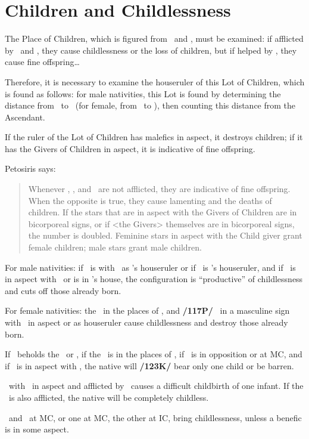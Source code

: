 \section{Children and Childlessness}
The Place of Children, which is figured from \Mercury\, and \Venus, must be examined: if afflicted by \Saturn\, and \Mars, they cause childlessness or the loss of children, but if helped by \Jupiter, they cause fine offspring\ldots

Therefore, it is necessary to examine the houseruler of this Lot of Children, which is found as follows: for male nativities, this Lot is found by determining the distance from \Jupiter\, to \Mercury\, (for female, from \Jupiter\, to \Venus), then counting this distance from the Ascendant. 

If the ruler of the Lot of Children has malefics in aspect, it destroys children; if it has the Givers of Children in aspect, it is indicative of fine offspring.

Petosiris says:\begin{quote}Whenever \Jupiter, \Venus, and \Mercury\, are not afflicted, they are indicative of fine offspring. When the opposite is true, they cause lamenting and the deaths of children. If the stars that are in aspect with the Givers of Children are in bicorporeal signs, or if <the Givers> themselves are in bicorporeal signs, the number is doubled. Feminine stars in aspect with the Child giver grant female children; male stars grant male children.\end{quote}

For male nativities: if \Jupiter\, is with \Mars\, as \Mars’s houseruler or if \Mars\, is \Jupiter’s houseruler, and if \Saturn\, is in aspect with \Venus\, or is in \Venus's house, the configuration is “productive” of childlessness and cuts off those already born.

For female nativities: the \Moon\, in the places of \Mercury, and \textbf{/117P/} \Venus\, in a masculine sign with \Saturn\, in aspect or as houseruler cause childlessness and destroy those already born. 

If \Jupiter\, beholds the \Moon\, or \Venus, if the \Moon\, is in the places of \Mercury, if \Saturn\, is in opposition or at MC, and if \Mars\, is in aspect with \Saturn, the native will \textbf{/123K/} bear only one child or be barren. 

\Venus\, with \Jupiter\, in aspect and afflicted by \Saturn\, causes a difficult childbirth of one infant. If the \Moon\, is also afflicted, the native will be completely childless. 

\Saturn\, and \Mars\, at MC, or one at MC, the other at IC, bring childlessness, unless a benefic is in some aspect.

\newpage